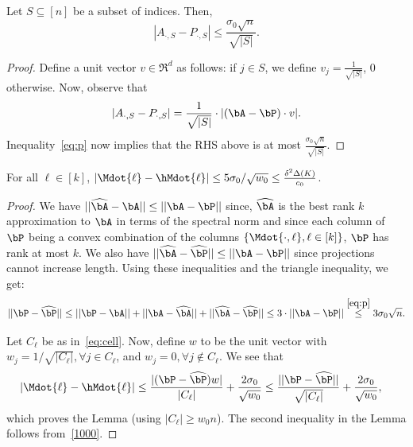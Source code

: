 \begin{claim}
\label{cl:sum}
Let $S \subseteq [n]$ be a subset of indices. Then, $$|A_{\cdot, S} - P_{\cdot, S}| \leq \frac{\sigma_0 \sqrt n}{\sqrt{|S|}}. $$
\end{claim}
\begin{proof}
Define a unit vector $v \in \Re^d$ as follows: if $j \in S$, we define $v_j = \frac{1}{\sqrt{|S|}}$, 0 otherwise. Now, observe that 
$$|A_{\cdot, S} - P_{\cdot, S}| = \frac{1}{\sqrt{|S|}} \cdot |(\bA - \bP) \cdot v|. $$
Inequality~\eqref{eq:p} now implies that the RHS above is at most 
$\frac{\sigma_0 \sqrt{n}}{\sqrt{|S|}}.$
\end{proof}


\begin{lemma}
\label{lem:close}
For all $\ell\in [k]$, 
$|\Mdot{\ell}-\hMdot{\ell}|\leq 5 \sigma_0/\sqrt{w_0} \leq \frac{\delta^2 \Delta(K)}{c_0}$.
\end{lemma}

\begin{proof}
We have $||\widehat{\bA}-\bA||\leq ||\bA-\bP||$ since, $\widehat{\bA}$ is the best rank $k$ approximation to $\bA$ in terms of the spectral norm and since each column of $\bP$ being a convex combination of the columns $\{ \Mdot{\cdot,\ell},\ell\in [k]\}$,
$\bP$ has rank at most $k$. We also have $||\widehat{\bA}-\widehat{\bP}||\leq ||\bA-\bP||$ since projections cannot increase length. Using these inequalities and the triangle inequality, we get: 
$$||\bP-\widehat{\bP}||\leq ||\bP-\bA||+||\bA-\widehat{\bA}||+||\widehat{\bA}-\widehat{\bP}||\leq 3 \cdot ||\bA-\bP|| \stackrel{\eqref{eq:p}}{\leq} 3\sigma_0\sqrt n.$$ 

Let $C_\ell$ be as in~\eqref{eq:cell}.  
 Now, define $w$ to be the unit vector with $w_j=1/\sqrt{|C_\ell|}, \forall j\in C_\ell$, and $w_j=0, \forall j\notin C_\ell$. We see that 
\begin{align*}
& |\Mdot{\ell}-\hMdot{\ell}|\leq \frac{|(\bP-\widehat{\bP})w|}{|C_\ell|}+\frac{2\sigma_0}{\sqrt{w_0}} 
\leq \frac{||\bP -\widehat {\bP }||}{\sqrt{|C_\ell |}} +\frac{2\sigma_0}{\sqrt{w_0}},
\end{align*}
 which proves the Lemma (using $|C_\ell| \geq w_0 n$). The second inequality in the Lemma follows from~\eqref{1000}.
\end{proof}

